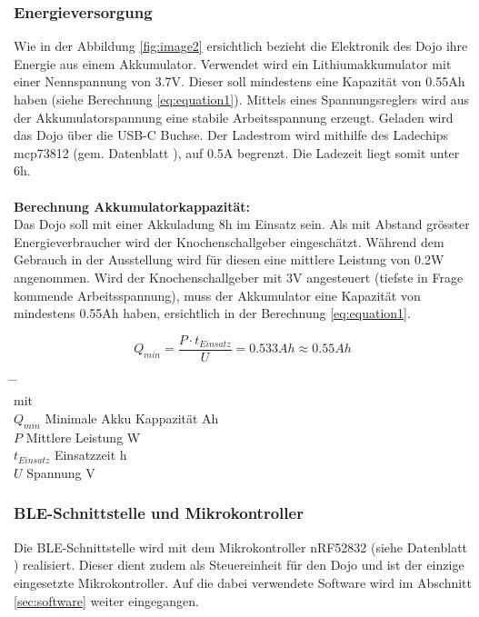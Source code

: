 \documentclass[10pt,a4paper,oneside]{99_fhnwreport}
\begin{document}
\subsubsection{Energieversorgung}
Wie in der Abbildung \ref{fig:image2} ersichtlich bezieht die Elektronik des Dojo ihre Energie aus einem Akkumulator. Verwendet wird ein Lithiumakkumulator mit einer Nennspannung von 3.7V. Dieser soll mindestens eine Kapazität von 0.55Ah haben (siehe Berechnung \ref{eq:equation1}). Mittels eines Spannungsreglers wird aus der Akkumulatorspannung eine stabile Arbeitsspannung erzeugt. Geladen wird das Dojo über die USB-C Buchse. Der Ladestrom wird mithilfe des Ladechips mcp73812 (gem. Datenblatt \cite{MCP73811}), auf 0.5A begrenzt. Die Ladezeit liegt somit unter 6h.\\
\\
\textbf{Berechnung Akkumulatorkappazität:}\\
Das Dojo soll mit einer Akkuladung 8h im Einsatz sein. Als mit Abstand grösster Energieverbraucher wird der Knochenschallgeber eingeschätzt. Während dem Gebrauch in der Ausstellung wird für diesen eine mittlere Leistung von 0.2W angenommen. Wird der Knochenschallgeber mit 3V angesteuert (tiefste in Frage kommende Arbeitsspannung), muss der Akkumulator eine Kapazität von mindestens 0.55Ah haben, ersichtlich in der Berechnung \ref{eq:equation1}.

\begin{equation}
Q_{min} = \frac{P \cdot t_{Einsatz}}{U} = 0.533Ah \approx 0.55Ah
\label{eq:equation1}
\end{equation}
\begin{tabbing}
\hspace{20mm}	\=  \hspace{60mm} \= \hspace{30mm}	\= 	\\
mit	\\
$Q_{min}$	\> Minimale Akku Kappazität	 Ah	\>	\\
$P$		\> Mittlere Leistung		 W \>	\\
$t_{Einsatz}$	\> Einsatzzeit			 h	\\
$U$		\> Spannung			 V	\\
\end{tabbing}

\subsubsection{BLE-Schnittstelle und Mikrokontroller}
Die BLE-Schnittstelle wird mit dem Mikrokontroller nRF52832 (siehe Datenblatt \cite{NRF52832}) realisiert. Dieser dient zudem als Steuereinheit für den Dojo und ist der einzige eingesetzte Mikrokontroller. Auf die dabei verwendete Software wird im Abschnitt \ref{sec:software} weiter eingegangen.
\end{document}
